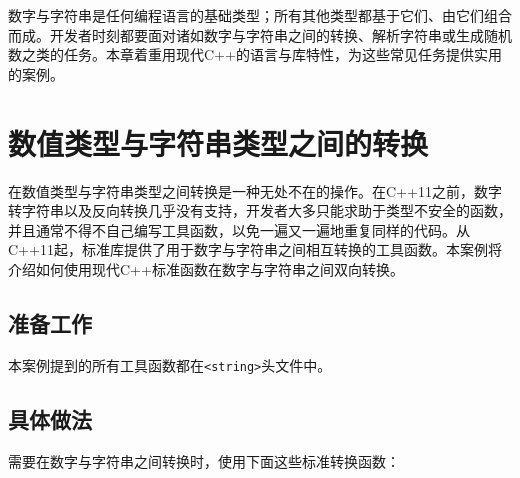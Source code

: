 数字与字符串是任何编程语言的基础类型；所有其他类型都基于它们、由它们组合而成。开发者时刻都要面对诸如数字与字符串之间的转换、解析字符串或生成随机数之类的任务。本章着重用现代C++的语言与库特性，为这些常见任务提供实用的案例。



\section{数值类型与字符串类型之间的转换}



在数值类型与字符串类型之间转换是一种无处不在的操作。在C++11之前，数字转字符串以及反向转换几乎没有支持，开发者大多只能求助于类型不安全的函数，并且通常不得不自己编写工具函数，以免一遍又一遍地重复同样的代码。从C++11起，标准库提供了用于数字与字符串之间相互转换的工具函数。本案例将介绍如何使用现代C++标准函数在数字与字符串之间双向转换。



\subsection{准备工作}



本案例提到的所有工具函数都在\texttt{<\allowbreak{}string>}头文件中。



\subsection{具体做法}



需要在数字与字符串之间转换时，使用下面这些标准转换函数：



